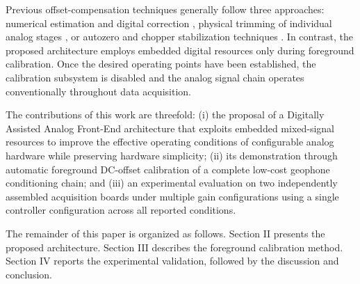 Previous offset-compensation techniques generally follow three approaches: numerical estimation and digital correction \cite{InfineonAN68403,Lopin2018}, physical trimming of individual analog stages \cite{Mohan2020}, or autozero and chopper stabilization techniques . In contrast, the proposed architecture employs embedded digital resources only during foreground calibration. Once the desired operating points have been established, the calibration subsystem is disabled and the analog signal chain operates conventionally throughout data acquisition.

The contributions of this work are threefold: (i) the proposal of a Digitally Assisted Analog Front-End architecture that exploits embedded mixed-signal resources to improve the effective operating conditions of configurable analog hardware while preserving hardware simplicity; (ii) its demonstration through automatic foreground DC-offset calibration of a complete low-cost geophone conditioning chain; and (iii) an experimental evaluation on two independently assembled acquisition boards under multiple gain configurations using a single controller configuration across all reported conditions.

The remainder of this paper is organized as follows. Section II presents the proposed architecture. Section III describes the foreground calibration method. Section IV reports the experimental validation, followed by the discussion and conclusion.
